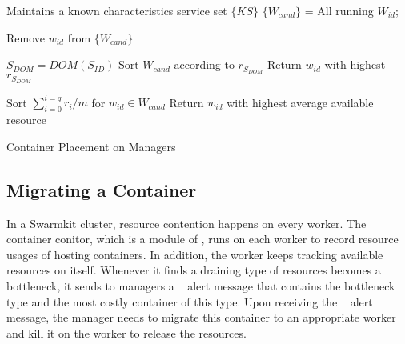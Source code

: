\begin{algorithm}[ht]
\begin{algorithmic}[1]
\STATE Maintains a known characteristics service set $\{KS\}$
\STATE $\{W_{cand}\}$ = All running $W_{id}$;

\STATE Remove $w_{id}$ from $\{W_{cand}\}$
\ENDIF
\ENDFOR

\STATE $S_{DOM} =  DOM(S_{ID})$
\STATE Sort $W_{cand}$ according to $r_{S_{DOM}}$
\STATE Return $w_{id}$ with highest $r_{S_{DOM}}$

\begin{comment}
  \IF {$S_{dom} = ``M''$}
  \STATE Sort $\{W_{cand}\}$ according to $W_{mem}$
  \STATE Return $W_{id}$ with highest $W_{mem}$

  \ELSIF {$S_{DOM} = ``C''$}
  \STATE Sort $\{W_{cand}\}$ according to $W_{cpu}$
  \STATE Return $W_{id}$ with highest $W_{cpu}$

  \ELSIF {$S_{dom} = ``N''$}
  \STATE Sort $\{W_{cand}\}$ according to $W_{net}$
  \STATE Return $W_{id}$ with highest $W_{net}$

  \ELSIF {$S_{dom} = ``IO''$}
  \STATE Sort $\{W_{cand}\}$ according to $W_{io}$
  \STATE Return $W_{id}$ with highest $W_{io}$
  \ENDIF
\end{comment}

  \ELSE
  \STATE Sort $\sum_{i=0}^{i=q} r_i / m$ for $w_{id} \in W_{cand}$
  \STATE Return $w_{id}$ with highest average available resource

\ENDIF

\end{algorithmic}
\caption{Container Placement on Managers}
\label{alg:initial}
\end{algorithm}



\subsection{Migrating a Container}
In a Swarmkit cluster, resource contention happens on every worker.
The container conitor, which is a module of \sol, runs on each worker to record resource usages of hosting containers.
In addition, the worker keeps tracking available resources on itself. Whenever it finds a draining type of
resources becomes a bottleneck,  it sends to managers a \sol~ alert message that contains the bottleneck type and the
most costly container of this type. Upon receiving the \sol~ alert message, the manager needs
to migrate this container to an appropriate worker and kill it on the worker to release the resources. 

